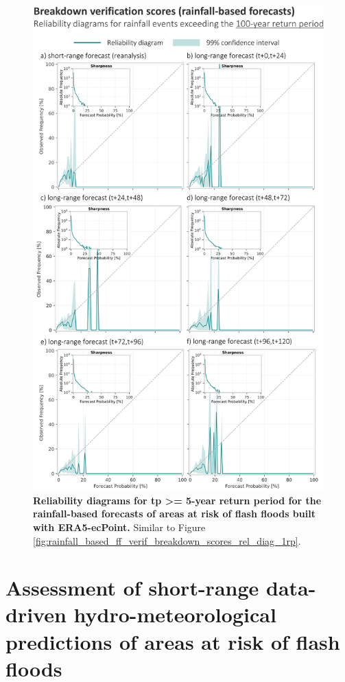 \begin{figure}[htbp]
\centering
\includegraphics[width=\textwidth]{rainfall_based_ff_verif_breakdown_scores_rel_diag_100rp.png}
\caption{\textbf{Reliability diagrams for tp >= 5-year return period for the rainfall-based forecasts of areas at risk of flash floods built with ERA5-ecPoint.} Similar to Figure \ref{fig:rainfall_based_ff_verif_breakdown_scores_rel_diag_1rp}.}
\label{fig:rainfall_based_ff_verif_breakdown_scores_rel_diag_100rp}
\end{figure}

\section{Assessment of short-range data-driven hydro-meteorological predictions of areas at risk of flash floods}
\label{verif_data_driven_short_fc}

